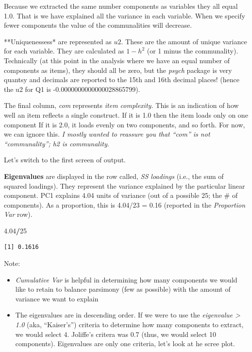 \documentclass[
  english,
]{book}
\newenvironment{Shaded}{\begin{snugshade}}{\end{snugshade}}
\newcommand{\DecValTok}[1]{\textcolor[rgb]{0.00,0.00,0.81}{#1}}
\newcommand{\FloatTok}[1]{\textcolor[rgb]{0.00,0.00,0.81}{#1}}
\newcommand{\OperatorTok}[1]{\textcolor[rgb]{0.81,0.36,0.00}{\textbf{#1}}}
\providecommand{\tightlist}{%
  \setlength{\itemsep}{0pt}\setlength{\parskip}{0pt}}
\begin{document}
Because we extracted the same number components as variables they all equal 1.0. That is we have explained all the variance in each variable. When we specify fewer components the value of the communalities will decrease.

**Uniquenessess* are represented as \(u2\). These are the amount of unique variance for each variable. They are calculated as \(1 - h^2\) (or 1 minus the communality). Technically (at this point in the analysis where we have an equal number of components as items), they should all be zero, but the \emph{psych} package is very quantsy and decimals are reported to the 15th and 16th decimal places! (hence the u2 for Q1 is -0.0000000000000028865799).

The final column, \emph{com} represents \emph{item complexity.} This is an indication of how well an item reflects a single construct. If it is 1.0 then the item loads only on one component If it is 2.0, it loads evenly on two components, and so forth. For now, we can ignore this. \emph{I mostly wanted to reassure you that ``com'' is not ``communality''; h2 is communality}.

Let's switch to the first screen of output.

\textbf{Eigenvalues} are displayed in the row called, \emph{SS loadings} (i.e., the sum of squared loadings). They represent the variance explained by the particular linear component. PC1 explains 4.04 units of variance (out of a possible 25; the \# of components). As a proportion, this is 4.04/23 = 0.16 (reported in the \emph{Proportion Var} row).

\begin{Shaded}
\begin{Highlighting}[]
\FloatTok{4.04}\OperatorTok{/}\DecValTok{25}
\end{Highlighting}
\end{Shaded}

\begin{verbatim}
[1] 0.1616
\end{verbatim}

Note:

\begin{itemize}
\tightlist
\item
  \emph{Cumulative Var} is helpful in determining how many components we would like to retain to balance parsimony (few as possible) with the amount of variance we want to explain
\item
  The eigenvalues are in descending order. If we were to use the \emph{eigenvalue \textgreater{} 1.0} (aka, ``Kaiser's'') criteria to determine how many components to extract, we would select 4. Joliffe's critera was 0.7 (thus, we would select 10 components). Eigenvalues are only one criteria, let's look at he scree plot.
\end{itemize}
\end{document}
